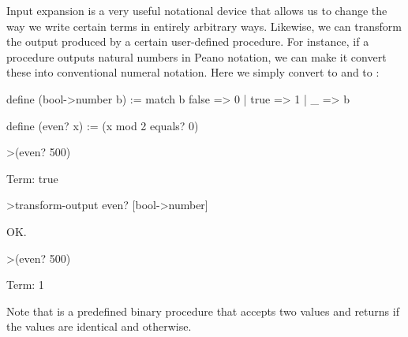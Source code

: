 Input expansion is a very useful notational device that allows us to change the way we write certain terms in entirely arbitrary ways. 
Likewise, we can transform the output produced by a certain user-defined procedure. For instance, if a procedure outputs natural numbers in Peano notation, 
we can make it convert these into conventional numeral notation. Here we simply convert  to  and  to :
\begin{tcAthena}[upquote=true]
define (bool->number b) := 
  match b {
    false => 0
  | true => 1
  | _ => b
  }

define (even? x) := (x mod 2 equals? 0)

>(even? 500)

Term: true

>transform-output even? [bool->number]

OK.

>(even? 500)

Term: 1
\end{tcAthena}
Note that  is a predefined binary procedure that accepts two values and returns  if the values are identical 
and  otherwise. 

